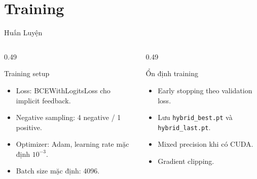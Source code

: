 \documentclass[aspectratio=169,10pt]{beamer}
\begin{document}
\section{Training}
\begin{frame}{Huấn Luyện}
  \begin{columns}[T,totalwidth=\textwidth]
    \begin{column}{0.49\textwidth}
      \begin{block}{Training setup}
        \begin{itemize}
          \item Loss: BCEWithLogitsLoss cho implicit feedback.
          \item Negative sampling: 4 negative / 1 positive.
          \item Optimizer: Adam, learning rate mặc định $10^{-3}$.
          \item Batch size mặc định: 4096.
        \end{itemize}
      \end{block}
    \end{column}
    \begin{column}{0.49\textwidth}
      \begin{block}{Ổn định training}
        \begin{itemize}
          \item Early stopping theo validation loss.
          \item Lưu \texttt{hybrid\_best.pt} và \texttt{hybrid\_last.pt}.
          \item Mixed precision khi có CUDA.
          \item Gradient clipping.
        \end{itemize}
      \end{block}
    \end{column}
  \end{columns}
\end{frame}
\end{document}
